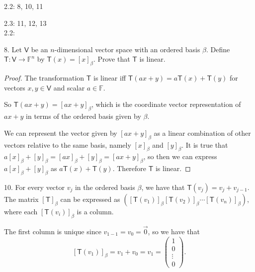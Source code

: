 \documentclass[11pt]{article}
\newcommand{\br}[1]{\left(#1\right)}
\newcommand{\sbr}[1]{\left[#1\right]}
\begin{document}
2.2: 8, 10, 11 

2.3: 11, 12, 13 \\

2.2: 

8. Let $\mathsf{V}$ be an $n$-dimensional vector space with an ordered basis $\beta$. Define $\mathsf{T} : \mathsf{V}\to\mathbb{F}^n$ by $\mathsf{T}(x) = \sbr{x}_{\beta}$. Prove that $\mathsf{T}$ is linear.

\begin{proof}
    The transformation $\mathsf{T}$ is linear iff $\mathsf{T}(ax+y) = a\mathsf{T}(x) + \mathsf{T}(y)$ for vectors $x,y\in\mathsf{V}$ and scalar $a\in\mathbb{F}$.

    So $\mathsf{T}(ax+y) = \sbr{ax+y}_{\beta}$, which is the coordinate vector representation of $ax+y$ in terms of the ordered basis given by $\beta$.

    We can represent the vector given by $\sbr{ax+y}_{\beta}$ as a linear combination of other vectors relative to the same basis, namely $\sbr{x}_{\beta}$ and $\sbr{y}_{\beta}$. It is true that $a\sbr{x}_{\beta} + \sbr{y}_{\beta} = \sbr{ax}_{\beta} + \sbr{y}_{\beta} = \sbr{ax+y}_{\beta}$, so then we can express $a\sbr{x}_{\beta} + \sbr{y}_{\beta}$ as $a\mathsf{T}(x) + \mathsf{T}(y)$. Therefore $\mathsf{T}$ is linear.
\end{proof}

10. For every vector $v_j$ in the ordered basis $\beta$, we have that $\mathsf{T}(v_j) = v_j+v_{j-1}$. The matrix $\sbr{\mathsf{T}}_{\beta}$ can be expressed as $\br{\sbr{\mathsf{T}(v_1)}_{\beta} \sbr{\mathsf{T}(v_2)}_{\beta} \cdots \sbr{\mathsf{T}(v_n)}_{\beta}}$, where each $\sbr{\mathsf{T}(v_i)}_{\beta}$ is a column.

The first column is unique since $v_{1-1} = v_0 = \vec{0}$, so we have that $$\sbr{\mathsf{T}(v_1)}_{\beta} = v_1+v_0 = v_1 = \begin{pmatrix}
    1 \\
    0 \\
    \vdots \\
    0
\end{pmatrix}.$$
\end{document}
